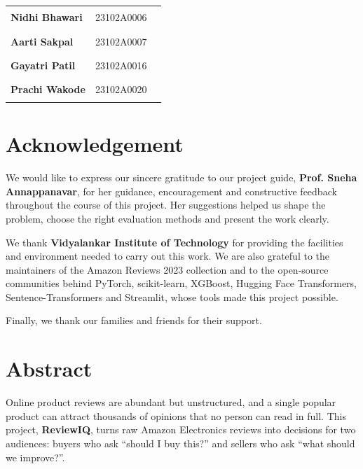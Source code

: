 \documentclass[12pt,a4paper]{report}
\begin{document}
\vspace{1.5cm}
\noindent
\begin{tabular}{@{}lll@{}}
\textbf{Nidhi Bhawari} & 23102A0006 & \rule{4cm}{0.4pt} \\[18pt]
\textbf{Aarti Sakpal} & 23102A0007 & \rule{4cm}{0.4pt} \\[18pt]
\textbf{Gayatri Patil} & 23102A0016 & \rule{4cm}{0.4pt} \\[18pt]
\textbf{Prachi Wakode} & 23102A0020 & \rule{4cm}{0.4pt} \\
\end{tabular}
\clearpage

\chapter*{Acknowledgement}
We would like to express our sincere gratitude to our project guide, \textbf{Prof. Sneha Annappanavar}, for her guidance, encouragement and constructive feedback throughout the course of this project. Her suggestions helped us shape the problem, choose the right evaluation methods and present the work clearly.

We thank \textbf{Vidyalankar Institute of Technology} for providing the facilities and environment needed to carry out this work. We are also grateful to the maintainers of the Amazon Reviews 2023 collection and to the open-source communities behind PyTorch, scikit-learn, XGBoost, Hugging Face Transformers, Sentence-Transformers and Streamlit, whose tools made this project possible.

Finally, we thank our families and friends for their support.

\clearpage

\chapter*{Abstract}
Online product reviews are abundant but unstructured, and a single popular product can attract thousands of opinions that no person can read in full. This project, \textbf{ReviewIQ}, turns raw Amazon Electronics reviews into decisions for two audiences: buyers who ask ``should I buy this?'' and sellers who ask ``what should we improve?''.
\end{document}
